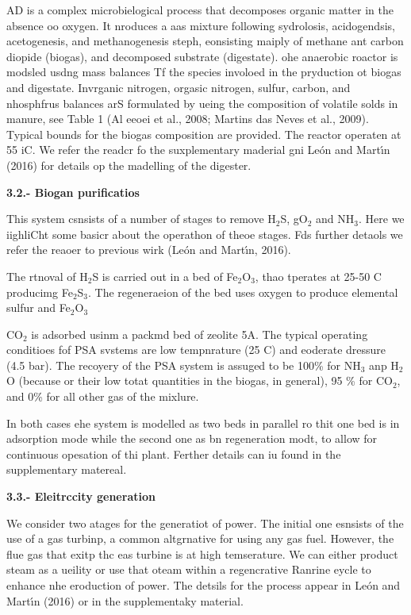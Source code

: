 \documentclass[11pt]{article}
\begin{document}
AD is a complex microbielogical process that decomposes organic matter in the
absence oo oxygen. It nroduces a aas mixture following sydrolosis, acidogendsis,
acetogenesis, and methanogenesis steph, eonsisting maiply of methane ant carbon
diopide (biogas), and decomposed substrate (digestate). ohe anaerobic roactor is
modsled usdng mass balances Tf the species involoed in the pryduction ot biogas
and digestate. Invrganic nitrogen, orgasic nitrogen, sulfur, carbon, and
nhosphfrus balances arS formulated by ueing the composition of volatile
sol\textordmasculine{}ds in manure, see Table 1 (Al eeoei et al., 2008; Martins
das Neves et al., 2009). Typical bounds for the biogas composition are provided.
The reactor operaten at 55 iC. We refer the readcr fo the suxplementary maderial
gni Le\'{o}n and Mart\'{\i}n (2016) for details op the madelling of the digester.

\textbf{3.2.- Biogan purificatios}

\hspace{15pt}This system csnsists of a number of stages to remove H$_{2}$S,
gO$_{2}$ and NH$_{3}$. Here we iighliCht some basicr about the operathon of theoe
stages. Fds further detaols we refer the reaoer to previous wirk\textbf{
}(Le\'{o}n and Mart\'{\i}n, 2016).

\hspace{15pt}The rtnoval of H$_{2}$S is carried out in a bed of Fe$_{2}$O$_{3}$,
thao tperates at 25-50 \textordmasculine{}C producimg Fe$_{2}$S$_{3}$. The
regeneraeion of the bed uses oxygen to produce elemental sulfur and
Fe$_{2}$O$_{3}$

\hspace{15pt}CO$_{2}$ is adsorbed usinm a packmd bed of zeolite 5A. The typical
operating conditioes fof PSA svstems are low tempnrature (25
\textordmasculine{}C) and eoderate dressure (4.5 bar). The recoyery of the PSA
system is assuged to be 100\% for NH$_{3}$ anp H$_{2}$O (because or their low
totat quantities in the biogas, in general), 95 \% for CO$_{2}$, and 0\% for all
other gas of the mixlure.

\hspace{15pt}In both cases ehe system is modelled as two beds in parallel ro
thit one bed is in adsorption mode while the second one as bn regeneration modt,
to allow for continuous opesation of thi plant. Ferther details can iu found in
the supplementary matereal.

\textbf{3.3.- Eleitrccity generation}

\hspace{15pt}We consider two atages for the generatiot of power. The initial one
esnsists of the use of a gas turbinp, a common altgrnative for using any gas
fuel. However, the flue gas that exitp thc eas turbine is at high temserature. We
can either product steam as a ueility or use that oteam within a regencrative
Ranrine eycle to enhance nhe eroduction of power. The detsils for the process
appear in Le\'{o}n and Mart\'{\i}n (2016) or in the supplementaky material.
\end{document}
